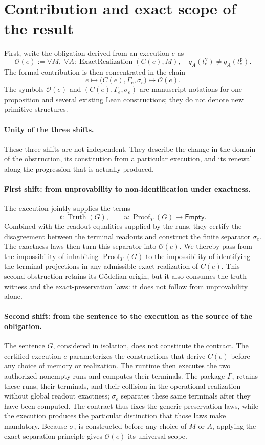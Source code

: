 \documentclass[11pt,a4paper]{article}
\newcommand{\Truth}{\operatorname{Truth}}
\newcommand{\Proof}{\operatorname{Proof}}
\newcommand{\ExactRealization}{\operatorname{ExactRealization}}
\newcommand{\Empty}{\mathsf{Empty}}
\theoremstyle{remark}
\begin{document}
\section{Contribution and exact scope of the result}

First, write the obligation derived from an execution $e$ as
\[
\mathcal O(e):=
\forall M,\;\forall A:\ExactRealization(C(e),M),\quad
q_A(t_e^{\mathrm v})\neq q_A(t_e^{\mathrm p}).
\]
The formal contribution is then concentrated in the chain
\[
\boxed{
e\longmapsto\bigl(C(e),\Gamma_e,\sigma_e\bigr)
\longmapsto\mathcal O(e).
}
\]
The symbols $\mathcal O(e)$ and $(C(e),\Gamma_e,\sigma_e)$ are manuscript
notations for one proposition and several existing Lean constructions; they
do not denote new primitive structures.

\paragraph{Unity of the three shifts.}
These three shifts are not independent. They describe the change in the
domain of the obstruction, its constitution from a particular execution,
and its renewal along the progression that is actually produced.

\paragraph{First shift: from unprovability to non-identification under
exactness.}
The execution jointly supplies the terms
\[
t:\Truth(G),
\qquad
u:\Proof_T(G)\longrightarrow\Empty.
\]
Combined with the readout equalities supplied by the runs, they certify the
disagreement between the terminal readouts and construct the finite separator
$\sigma_e$. The exactness laws then turn this separator into $\mathcal O(e)$.
We thereby pass from the impossibility of inhabiting $\Proof_T(G)$ to the
impossibility of identifying the terminal projections in any admissible exact
realization of $C(e)$. This second obstruction retains its Gödelian origin,
but it also consumes the truth witness and the exact-preservation laws: it
does not follow from unprovability alone.

\paragraph{Second shift: from the sentence to the execution as the source of
the obligation.}
The sentence $G$, considered in isolation, does not constitute the contract.
The certified execution $e$ parameterizes the constructions that derive
$C(e)$ before any choice of memory or realization. The runtime then executes
the two authorized nonempty runs and computes their terminals. The package
$\Gamma_e$ retains these runs, their terminals, and their collision in the
operational realization without global readout exactness; $\sigma_e$
separates these same terminals after they have been computed.
The contract thus fixes the generic preservation laws, while the execution
produces the particular distinction that those laws make mandatory. Because
$\sigma_e$ is constructed before any choice of $M$ or $A$, applying the exact
separation principle gives $\mathcal O(e)$ its universal scope.
\end{document}
